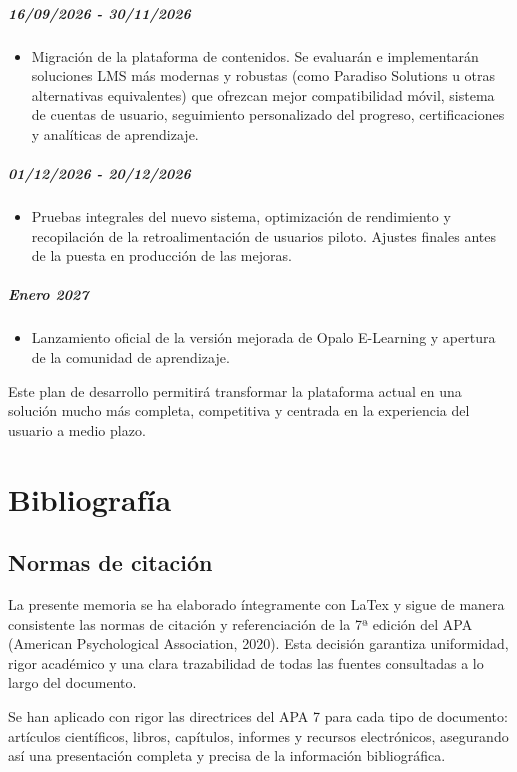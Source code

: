 \documentclass[11.5pt]{article}
\begin{document}
	\noindent\subparagraph*{16/09/2026 - 30/11/2026}
	
	\begin{itemize}
		\item Migración de la plataforma de contenidos. Se evaluarán e implementarán soluciones LMS más modernas y robustas (como Paradiso Solutions u otras alternativas equivalentes) que ofrezcan mejor compatibilidad móvil, sistema de cuentas de usuario, seguimiento personalizado del progreso, certificaciones y analíticas de aprendizaje.
	\end{itemize}
	
	\noindent\subparagraph*{01/12/2026 - 20/12/2026}
	
	\begin{itemize}
		\item Pruebas integrales del nuevo sistema, optimización de rendimiento y recopilación de la retroalimentación de usuarios piloto. Ajustes finales antes de la puesta en producción de las mejoras.
	\end{itemize}
	
	\noindent\subparagraph*{Enero 2027}
	
	\begin{itemize}
		\item Lanzamiento oficial de la versión mejorada de Opalo E-Learning y apertura de la comunidad de aprendizaje.
	\end{itemize}
	
	Este plan de desarrollo permitirá transformar la plataforma actual en una solución mucho más completa, competitiva y centrada en la experiencia del usuario a medio plazo.

	\section{Bibliografía}
	\subsection{Normas de citación}
	
	La presente memoria se ha elaborado íntegramente con LaTex y sigue de manera consistente las normas de citación y referenciación de la 7ª edición del APA (American Psychological Association, 2020). Esta decisión garantiza uniformidad, rigor académico y una clara trazabilidad de todas las fuentes consultadas a lo largo del documento.
	
	Se han aplicado con rigor las directrices del APA 7 para cada tipo de documento: artículos científicos, libros, capítulos, informes y recursos electrónicos, asegurando así una presentación completa y precisa de la información bibliográfica.
	
\end{document}
